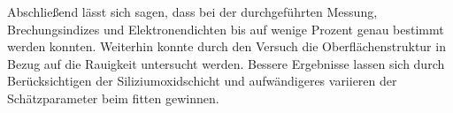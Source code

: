 %

Abschließend lässt sich sagen, dass bei der durchgeführten Messung, 
Brechungsindizes und Elektronendichten bis auf wenige Prozent genau bestimmt werden konnten.
Weiterhin konnte durch den Versuch die Oberflächenstruktur in Bezug auf die Rauigkeit untersucht werden.
Bessere Ergebnisse lassen sich durch Berücksichtigen der Siliziumoxidschicht und
aufwändigeres variieren der Schätzparameter beim fitten gewinnen.












%
%

